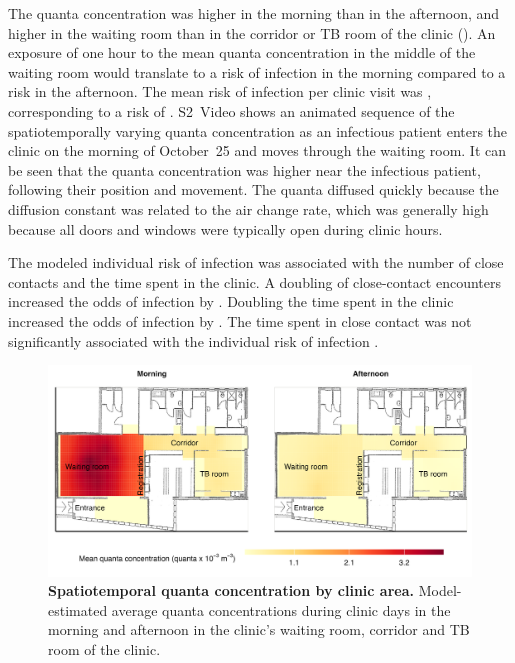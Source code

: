 \documentclass[fleqn,11pt]{wlscirep}
\begin{document}
The quanta concentration was higher in the morning than in the afternoon, and higher in the waiting room than in the corridor or TB room of the clinic (). An exposure of one hour to the mean quanta concentration in the middle of the waiting room would translate to a  risk of infection in the morning compared to a  risk in the afternoon. The mean risk of infection per clinic visit was , corresponding to a risk of . S2~Video shows an animated sequence of the spatiotemporally varying quanta concentration as an infectious patient enters the clinic on the morning of October~25 and moves through the waiting room. It can be seen that the quanta concentration was higher near the infectious patient, following their position and movement. The quanta diffused quickly because the diffusion constant was related to the air change rate, which was generally high because all doors and windows were typically open during clinic hours.

The modeled individual risk of infection was associated with the number of close contacts and the time spent in the clinic. A doubling of close-contact encounters increased the odds of infection by . Doubling the time spent in the clinic increased the odds of infection by . The time spent in close contact was not significantly associated with the individual risk of infection . 

\begin{figure}
    \centering
    \includegraphics{results/modeling/mean-quanta-concentration.png}
    \caption{\textbf{Spatiotemporal quanta concentration by clinic area.} Model-estimated average quanta concentrations during clinic days in the morning and afternoon in the clinic's waiting room, corridor and TB room of the clinic.}
    \label{fig:main-modeling-results}
\end{figure}
\end{document}
